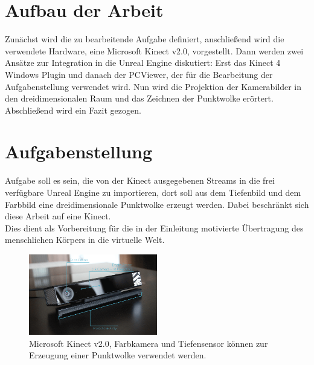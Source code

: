 \documentclass[a4paper]{IEEEtran}
\begin{document}
\section{Aufbau der Arbeit}
	Zunächst wird die zu bearbeitende Aufgabe definiert, anschließend wird die verwendete Hardware, eine Microsoft Kinect v2.0, vorgestellt. Dann werden zwei Ansätze zur Integration in die Unreal Engine diskutiert: Erst das Kinect 4 Windows Plugin und danach der PCViewer, der für die Bearbeitung der Aufgabenstellung verwendet wird. Nun wird die Projektion der Kamerabilder in den dreidimensionalen Raum und das Zeichnen der Punktwolke erörtert. Abschließend wird ein Fazit gezogen.


\section{Aufgabenstellung}
	Aufgabe soll es sein, die von der Kinect ausgegebenen Streams in die frei verfügbare Unreal Engine zu importieren, dort soll aus dem Tiefenbild und dem Farbbild eine dreidimensionale Punktwolke erzeugt werden. 
	Dabei beschränkt sich diese Arbeit auf eine Kinect. \\
	Dies dient als Vorbereitung für die in der Einleitung motivierte Übertragung des menschlichen Körpers in die virtuelle Welt. \\

\begin{figure}[!h]
    	\centering
		\includegraphics[width=0.5\textwidth]{img/Kinectv2}
	    \caption{Microsoft Kinect v2.0, Farbkamera und Tiefensensor können zur Erzeugung einer Punktwolke verwendet werden. {\cite{kinectpic}}}
    	\label{Kinectv2}
	\end{figure}
	
\end{document}
